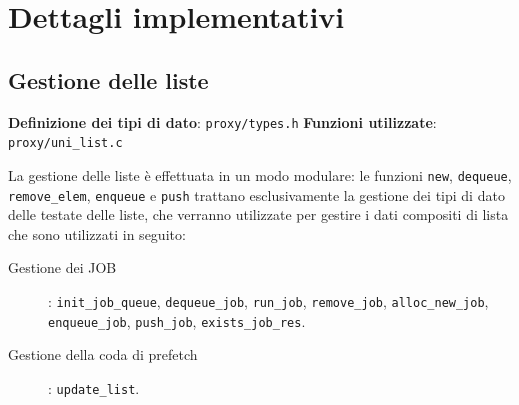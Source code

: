 \chapter{Dettagli implementativi}
\section{Gestione delle liste}
\begin{itemize}
\diam \textbf{Definizione dei tipi di dato}: \texttt{proxy/types.h}
\diam \textbf{Funzioni utilizzate}: \texttt{proxy/uni\_list.c}
\end{itemize}
La gestione delle liste è effettuata in un modo modulare: le funzioni
\texttt{new}, \texttt{dequeue}, \texttt{remove\_elem}, \texttt{enqueue} e \texttt{push} trattano
esclusivamente la gestione dei tipi di dato delle testate delle liste, che 
verranno utilizzate per gestire i dati compositi di lista che sono utilizzati
in seguito:
\begin{description}
\item[Gestione dei JOB]: \texttt{init\_job\_queue}, \texttt{dequeue\_job}, \texttt{run\_job},
	\texttt{remove\_job}, \texttt{alloc\_new\_job}, \texttt{enqueue\_job}, \texttt{push\_job},
	\texttt{exists\_job\_res}.
\item[Gestione della coda di prefetch]: \texttt{update\_list}.
\end{description}

